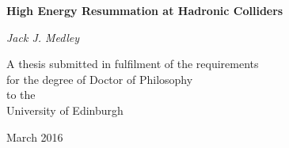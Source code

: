 \pagestyle{empty}

\begin{center}

\LARGE

{\bf High Energy Resummation at Hadronic Colliders}

\vspace{1cm}

\begin{figure}[ht]
\begin{center}
\end{center}
\end{figure}

\large

{\it Jack J. Medley}

\vspace{2cm}
\normalsize
A thesis submitted in fulfilment of the requirements\\
for the degree of Doctor of Philosophy\\
to the\\
University of Edinburgh

March 2016
\end{center}

